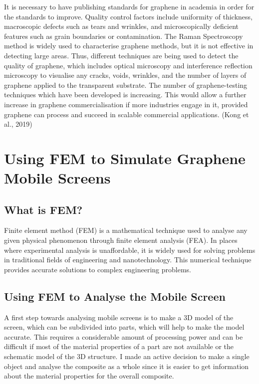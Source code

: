 \documentclass[a4paper,12pt]{article}
\numberwithin{equation}{section}
\numberwithin{figure}{section}
\begin{document}
\noindent It is necessary to have publishing standards for graphene in academia in order for the standards to improve. Quality control factors include uniformity of thickness, macroscopic defects such as tears and wrinkles, and microscopically deficient features such as grain boundaries or contamination. The Raman Spectroscopy method is widely used to characterise graphene methods, but it is not effective in detecting large areas. Thus, different techniques are being used to detect the quality of graphene, which includes optical microscopy and interference reflection microscopy to visualise any cracks, voids, wrinkles, and the number of layers of graphene applied to the transparent substrate. The number of graphene-testing techniques which have been developed is increasing. This would allow a further increase in graphene commercialisation if more industries engage in it, provided graphene can process and succeed in scalable commercial applications. (Kong et al., 2019)

\newpage
\section{Using FEM to Simulate Graphene Mobile Screens}

\subsection{What is FEM?}

\noindent Finite element method (FEM) is a mathematical technique used to analyse any given physical phenomenon through finite element analysis (FEA). In places where experimental analysis is unaffordable, it is widely used for solving problems in traditional fields of engineering and nanotechnology. This numerical technique provides accurate solutions to complex engineering problems.

\subsection{Using FEM to Analyse the Mobile Screen}

\noindent A first step towards analysing mobile screens is to make a 3D model of the screen, which can be subdivided into parts, which will help to make the model accurate. This requires a considerable amount of processing power and can be difficult if most of the material properties of a part are not available or the schematic model of the 3D structure. I made an active decision to make a single object and analyse the composite as a whole since it is easier to get information about the material properties for the overall composite.\vspace{\baselineskip}
\end{document}
